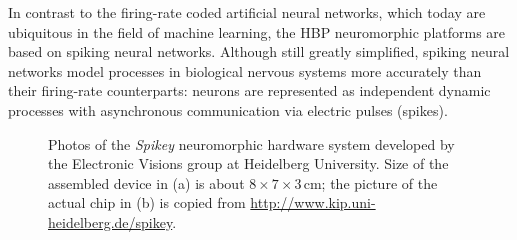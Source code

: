 In contrast to the firing-rate coded artificial neural networks, which today are ubiquitous in the field of machine learning, the \acrshort{HBP} neuromorphic platforms are based on spiking neural networks. Although still greatly simplified, spiking neural networks model processes in biological nervous systems more accurately than their firing-rate counterparts: neurons are represented as independent dynamic processes with asynchronous communication via electric pulses (spikes).

\begin{figure}
	\centering
	\caption[Photos of the Spikey neuromorphic hardware system]{Photos of the \emph{Spikey} neuromorphic hardware system developed by the Electronic Visions group at Heidelberg University. Size of the assembled device in (a) is about $8 \times 7 \times 3 \, \si{\centi\meter}$; the picture of the actual chip in (b) is copied from \url{http://www.kip.uni-heidelberg.de/spikey}.}
	\label{fig:spikey}
\end{figure}

